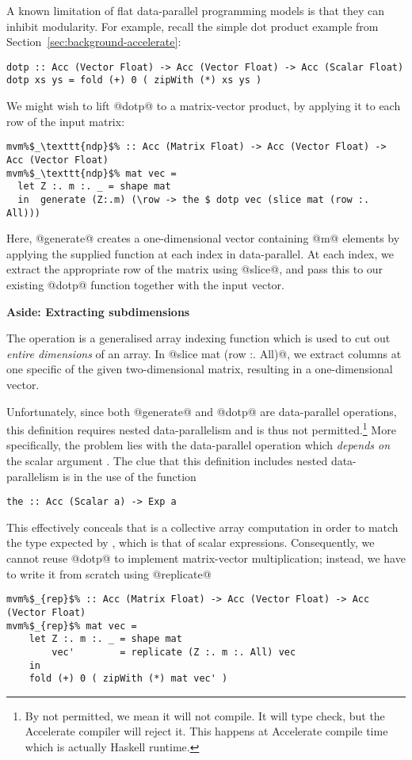 A known limitation of flat data-parallel programming models is that they can
inhibit modularity. For example, recall the simple dot product example from Section~\ref{sec:background-accelerate}:
%
\begin{lstlisting}
dotp :: Acc (Vector Float) -> Acc (Vector Float) -> Acc (Scalar Float)
dotp xs ys = fold (+) 0 ( zipWith (*) xs ys )
\end{lstlisting}
%
We might wish to lift @dotp@ to a matrix-vector product, by applying it to each row of the input matrix:
%
\begin{lstlisting}
mvm%$_\texttt{ndp}$% :: Acc (Matrix Float) -> Acc (Vector Float) -> Acc (Vector Float)
mvm%$_\texttt{ndp}$% mat vec =
  let Z :. m :. _ = shape mat
  in  generate (Z:.m) (\row -> the $ dotp vec (slice mat (row :. All)))
\end{lstlisting}
%
Here, @generate@ creates a one-dimensional vector containing @m@ elements by
applying the supplied function at each index in data-parallel. At each index, we
extract the appropriate row of the matrix using @slice@, and pass this to our existing @dotp@ function together with the input vector.

\begin{aside}
\begin{center}
\textbf{Aside: Extracting subdimensions}
\end{center}

The  operation is a generalised array indexing function
which is used to cut out \emph{entire dimensions} of an array. In @slice mat (row :. All)@,
we extract  columns at one specific  of the given
two-dimensional matrix, resulting in a one-dimensional vector.
\end{aside}


Unfortunately, since both @generate@ and @dotp@ are data-parallel operations,
this definition requires nested data-parallelism and is thus not permitted.\footnote{By not permitted, we mean it will not compile. It will type check, but the Accelerate compiler will reject it. This happens at Accelerate compile time which is actually Haskell runtime.}
%
More specifically, the problem lies with the data-parallel operation
 which \emph{depends on} the scalar argument . The clue that
this definition includes nested data-parallelism is in the use of the function
%
\begin{lstlisting}
the :: Acc (Scalar a) -> Exp a
\end{lstlisting}
%
This effectively conceals that  is a collective array computation in order to match the type expected by , which is that of scalar expressions.
Consequently, we cannot reuse @dotp@ to implement matrix-vector multiplication; instead, we have to write it from scratch using @replicate@
%
\begin{lstlisting}
mvm%$_{rep}$% :: Acc (Matrix Float) -> Acc (Vector Float) -> Acc (Vector Float)
mvm%$_{rep}$% mat vec =
    let Z :. m :. _ = shape mat
        vec'        = replicate (Z :. m :. All) vec
    in
    fold (+) 0 ( zipWith (*) mat vec' )
\end{lstlisting}
%

